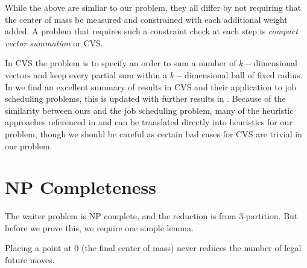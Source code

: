 While the above are simliar to our problem, they all differ by not requiring that the center of mass be measured and constrained with each additional weight added.  A problem that requires such a constraint check at each step is {\it compact vector summation} or CVS. 

In CVS the problem is to specify an order to sum a number of $k-$dimensional vectors and keep every partial sum within a $k-$dimensional ball of fixed radius. In \cite{sevast1994some} we find an excellent summary of results in CVS and their application to job scheduling problems, this is updated with further results in \cite{sevastianov1998nonstrict}.  Because of the similarity between ours and the job scheduling problem, many of the heuristic approaches referenced in \cite{framinan2004review} and \cite{gupta2006performance} can be translated directly into heuristics for our problem, though we should be careful as certain bad cases for CVS \cite{chelidze2010greedy} are trivial in our problem.

\section{NP Completeness}

The waiter problem is NP complete, and the reduction is from 3-partition.  But before we prove this, we require one simple lemma.

\begin{lem} \label{lem:zerosChangeNothing} 
Placing a point at 0 (the final center of mass) never reduces the number of legal future moves.  
\end{lem}

